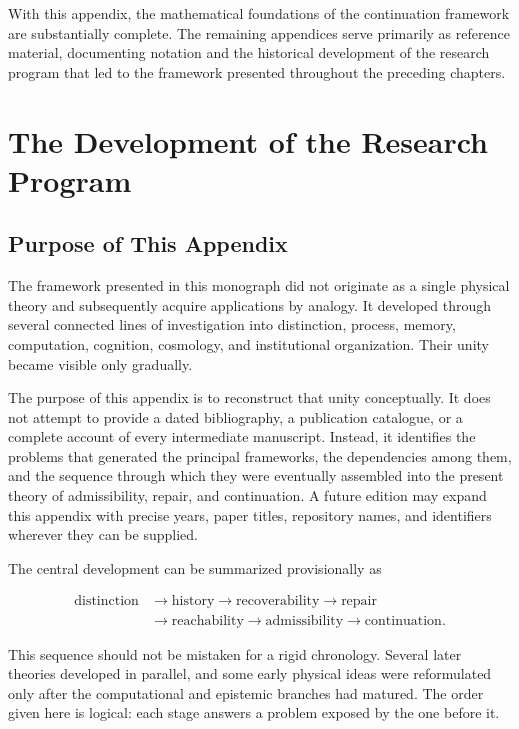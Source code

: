 \documentclass[11pt,oneside]{book}
\numberwithin{equation}{chapter}
\theoremstyle{definition}
\theoremstyle{plain}
\begin{document}
With this appendix, the mathematical foundations of the continuation framework are substantially complete. The remaining appendices serve primarily as reference material, documenting notation and the historical development of the research program that led to the framework presented throughout the preceding chapters.

\chapter{The Development of the Research Program}
\label{app:research-program}

\section{Purpose of This Appendix}

The framework presented in this monograph did not originate as a single
physical theory and subsequently acquire applications by analogy. It
developed through several connected lines of investigation into
distinction, process, memory, computation, cognition, cosmology, and
institutional organization. Their unity became visible only gradually.

The purpose of this appendix is to reconstruct that unity conceptually. It
does not attempt to provide a dated bibliography, a publication catalogue,
or a complete account of every intermediate manuscript. Instead, it
identifies the problems that generated the principal frameworks, the
dependencies among them, and the sequence through which they were
eventually assembled into the present theory of admissibility, repair, and
continuation. A future edition may expand this appendix with precise years,
paper titles, repository names, and identifiers wherever they can be
supplied.

The central development can be summarized provisionally as

\[
\boxed{
\begin{aligned}
\text{distinction}
&\longrightarrow
\text{history}
\longrightarrow
\text{recoverability}
\longrightarrow
\text{repair}
\\
&\longrightarrow
\text{reachability}
\longrightarrow
\text{admissibility}
\longrightarrow
\text{continuation}.
\end{aligned}
}
\]

This sequence should not be mistaken for a rigid chronology. Several later
theories developed in parallel, and some early physical ideas were
reformulated only after the computational and epistemic branches had
matured. The order given here is logical: each stage answers a problem
exposed by the one before it.
\end{document}
